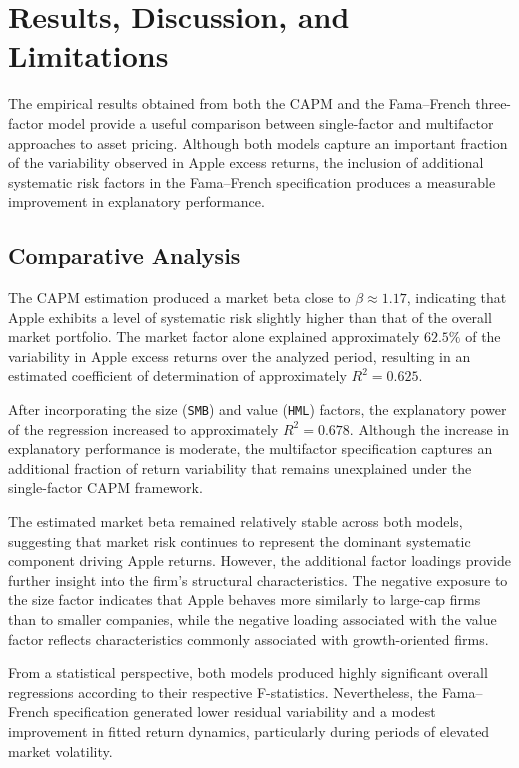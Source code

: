 \documentclass[
  12pt,
  letterpaper,
]{book}
\begin{document}
\section{Results, Discussion, and
Limitations}\label{results-discussion-and-limitations}

The empirical results obtained from both the CAPM and the Fama--French
three-factor model provide a useful comparison between single-factor and
multifactor approaches to asset pricing. Although both models capture an
important fraction of the variability observed in Apple excess returns,
the inclusion of additional systematic risk factors in the Fama--French
specification produces a measurable improvement in explanatory
performance.

\subsection{Comparative Analysis}\label{comparative-analysis}

The CAPM estimation produced a market beta close to
\(\beta \approx 1.17\), indicating that Apple exhibits a level of
systematic risk slightly higher than that of the overall market
portfolio. The market factor alone explained approximately \(62.5\%\) of
the variability in Apple excess returns over the analyzed period,
resulting in an estimated coefficient of determination of approximately
\(R^2 = 0.625\).

After incorporating the size (\texttt{SMB}) and value (\texttt{HML})
factors, the explanatory power of the regression increased to
approximately \(R^2 = 0.678\). Although the increase in explanatory
performance is moderate, the multifactor specification captures an
additional fraction of return variability that remains unexplained under
the single-factor CAPM framework.

The estimated market beta remained relatively stable across both models,
suggesting that market risk continues to represent the dominant
systematic component driving Apple returns. However, the additional
factor loadings provide further insight into the firm's structural
characteristics. The negative exposure to the size factor indicates that
Apple behaves more similarly to large-cap firms than to smaller
companies, while the negative loading associated with the value factor
reflects characteristics commonly associated with growth-oriented firms.

From a statistical perspective, both models produced highly significant
overall regressions according to their respective F-statistics.
Nevertheless, the Fama--French specification generated lower residual
variability and a modest improvement in fitted return dynamics,
particularly during periods of elevated market volatility.
\end{document}
